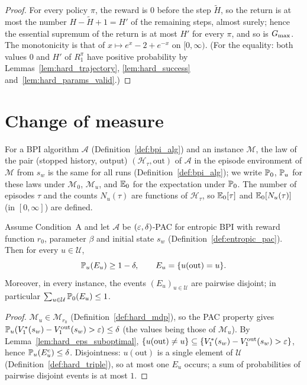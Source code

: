 \begin{proof}
\leanok
{}
For every policy $\pi$, the reward is $0$ before the step $\tilde H$, so the return is at most the
number $H - \tilde H + 1 = H'$ of the remaining steps, almost surely; hence the essential supremum of the
return is at most $H'$ for every $\pi$, and so is $G_{\max}$. The monotonicity is that of
$x \mapsto e^x - 2 + e^{-x}$ on $[0, \infty)$. (For the equality: both values $0$ and $H'$ of
$R^\pi_1$ have positive probability by Lemmas~\ref{lem:hard_trajectory}, \ref{lem:hard_success}
and~\ref{lem:hard_params_valid}.)
\end{proof}

\section{Change of measure}
\label{sec:lb_change_of_measure}

For a BPI algorithm $\mathcal A$ (Definition~\ref{def:bpi_alg}) and an instance $\mathcal M$, the
law of the pair (stopped history, output) $(\mathcal H_\tau, \mathrm{out})$ of $\mathcal A$ in the
episode environment of $\mathcal M$ from $s_w$ is the same for all runs (Definition~\ref{def:bpi_alg});
we write $\mathbb{P}_0$, $\mathbb{P}_u$ for these laws under $\mathcal M_0$, $\mathcal M_u$, and $\mathbb{E}_0$ for
the expectation under $\mathbb{P}_0$. The number of episodes $\tau$ and the counts $N_u(\tau)$ are
functions of $\mathcal H_\tau$, so $\mathbb{E}_0[\tau]$ and $\mathbb{E}_0[N_u(\tau)]$ (in $[0, \infty]$) are defined.

\begin{lemma}\label{lem:hard_pac_event}
\leanok
Assume Condition~A and let $\mathcal A$ be $(\varepsilon,\delta)$-PAC for entropic BPI with reward
function $r_0$, parameter $\beta$ and initial state $s_w$ (Definition~\ref{def:entropic_pac}).
Then for every $u \in \mathcal U$,
\[
  \mathbb{P}_u(E_u) \ge 1 - \delta, \qquad E_u = \{u(\mathrm{out}) = u\} .
\]
Moreover, in every instance, the events $(E_u)_{u \in \mathcal U}$ are pairwise disjoint; in
particular $\sum_{u \in \mathcal U}\mathbb{P}_0(E_u) \le 1$.
\end{lemma}

\begin{proof}
\leanok
{}
$\mathcal M_u \in \mathcal M_{r_0}$ (Definition~\ref{def:hard_mdp}), so the PAC property gives
$\mathbb{P}_u(V^*_1(s_w) - V^{\mathrm{out}}_1(s_w) > \varepsilon) \le \delta$ (the values being those of
$\mathcal M_u$). By Lemma~\ref{lem:hard_eps_suboptimal},
$\{u(\mathrm{out}) \ne u\} \subseteq \{V^*_1(s_w) - V^{\mathrm{out}}_1(s_w) > \varepsilon\}$, hence
$\mathbb{P}_u(E_u^c) \le \delta$. Disjointness: $u(\mathrm{out})$ is a single element of $\mathcal U$
(Definition~\ref{def:hard_triple}), so at most one $E_u$ occurs; a sum of probabilities of
pairwise disjoint events is at most $1$.
\end{proof}

